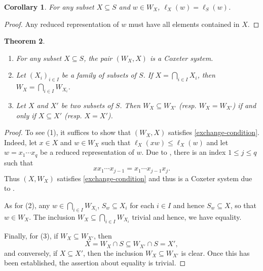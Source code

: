 \documentclass{article}
\theoremstyle{thmstyle}
\newtheorem{theorem}{Theorem}[section]
\theoremstyle{defstyle}
\newtheorem{corollary}[theorem]{Corollary}
\renewcommand{\le}{\leqslant}
\begin{document}
\begin{corollary}
    For any subset $X\subseteq S$ and $w\in W_X$, $\ell_{X}(w) = \ell_S(w)$.
\end{corollary}
\begin{proof}
    Any reduced representation of $w$ must have all elements contained in $X$.
\end{proof}

\begin{theorem}
\begin{enumerate}[label=(\arabic*)]
    \item For any subset $X\subseteq S$, the pair $(W_X, X)$ is a Coxeter system. 
    \item Let $(X_i)_{i\in I}$ be a family of subsets of $S$. If $X =\bigcap_{i\in I} X_i$, then $W_X = \bigcap_{i\in I} W_{X_i}$.
    \item Let $X$ and $X'$ be two subsets of $S$. Then $W_X\subseteq W_{X'}$ (resp. $W_X = W_{X'}$) if and only if $X\subseteq X'$ (resp. $X = X'$).
\end{enumerate}
\end{theorem}
\begin{proof}
    To see (1), it suffices to show that $(W_X, X)$ satisfies \ref{exchange-condition}. Indeed, let $x\in X$ and $w\in W_X$ such that $\ell_X(xw)\le\ell_X(w)$ and let $w = x_1\cdots x_q$ be a reduced representation of $w$. Due to , there is an index $1\le j\le q$ such that 
    \begin{equation*}
        xx_1\cdots x_{j - 1} = x_1\cdots x_{j - 1}x_j.
    \end{equation*}
    Thus $(X, W_X)$ satisfies \ref{exchange-condition} and thus is a Coxeter system due to .

    As for (2), any $w\in\bigcap_{i\in I} W_{X_i}$, $S_w\subseteq X_i$ for each $i\in I$ and hence $S_w\subseteq X$, so that $w\in W_X$. The inclusion $W_X\subseteq\bigcap_{i\in I} W_{X_i}$ trivial and hence, we have equality.

    Finally, for (3), if $W_X\subseteq W_{X'}$, then 
    \begin{equation*}
        X = W_X\cap S\subseteq W_{X'}\cap S = X',
    \end{equation*}
    and conversely, if $X\subseteq X'$, then the inclusion $W_X\subseteq W_{X'}$ is clear. Once this has been established, the assertion about equality is trivial.
\end{proof}
\end{document}
